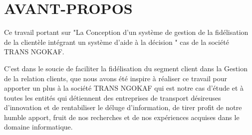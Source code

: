 \chapter*{AVANT-PROPOS}
Ce travail portant sur "La Conception d’un système de gestion de la fidélisation
de la clientèle intégrant un système d’aide à la décision
" cas de la société TRANS NGOKAF.
\newline

C’est dans le soucie de faciliter la fidélisation du segment client
dans la Gestion de la relation clients, que nous avons été inspire
à réaliser ce travail pour apporter un plus à la société TRANS NGOKAF
qui est notre cas d’étude et à toutes les entités qui détiennent des entreprises
de transport désireuses d’innovation et de rentabiliser le 
déluge d’information, de tirer profit de notre humble apport, fruit
de nos recherches et de nos expériences acquises dans le domaine informatique.